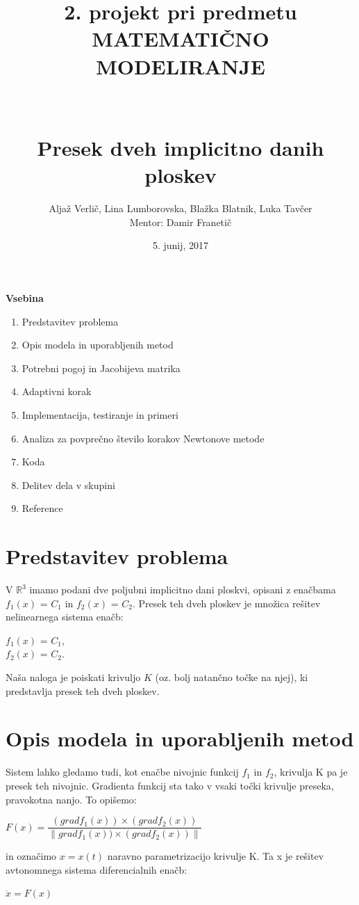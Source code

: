 \documentclass[12pt]{article}
\title{\small{2. projekt pri predmetu MATEMATIČNO MODELIRANJE} \\ \hfill \\ \hfill \\ \huge{\textbf{Presek dveh implicitno danih ploskev}}}
\author{Aljaž Verlič, Lina Lumborovska, Blažka Blatnik, Luka Tavčer \\
	Mentor: Damir Franetič}
\date{5. junij, 2017}
\begin{document}
\maketitle

\textbf{\large{Vsebina}} 
\begin{enumerate}
	\item Predstavitev problema
	\item Opis modela in uporabljenih metod
	\item Potrebni pogoj in Jacobijeva matrika
	\item Adaptivni korak
	\item Implementacija, testiranje in primeri
	\item Analiza za povpre\v{c}no \v{s}tevilo korakov Newtonove metode
	\item Koda
	\item Delitev dela v skupini
	\item Reference
\end{enumerate} 
\newpage

\section{Predstavitev problema}
	V $\mathbb{R}^3$ imamo podani dve poljubni implicitno dani ploskvi, opisani z enačbama $f_{1}(x)$ = $C_{1}$ in $f_{2}(x)$ = $C_{2}$. Presek teh dveh ploskev je množica rešitev nelinearnega sistema enačb:
	\begin{center}
		$f_{1}(x)$ = $C_{1}$,\\$f_{2}(x)$ = $C_{2}$.
	\end{center}
	Naša naloga je poiskati krivuljo $K$ (oz. bolj natan\v{c}no to\v{c}ke na njej), ki predstavlja presek teh dveh ploskev. \\

\section{Opis modela in uporabljenih metod}
    Sistem lahko gledamo tudi, kot enačbe nivojnic funkcij  $f_{1}$ in $f_{2}$, krivulja K pa je presek teh nivojnic. Gradienta funkcij sta tako v vsaki točki krivulje preseka, pravokotna nanjo. To opišemo:
    \begin{center}
        	$F(x) = \dfrac{(grad f_{1}(x))\times(grad f_{2}(x))}{\|grad f_{1}(x))\times(grad f_{2}(x))\|}$
    \end{center}
   in označimo $x = x(t)$ naravno parametrizacijo krivulje K. Ta x je rešitev avtonomnega sistema diferencialnih enačb:
   \begin{center}
		$\dot{x} = F(x)$
	\end{center}
	
\end{document}
